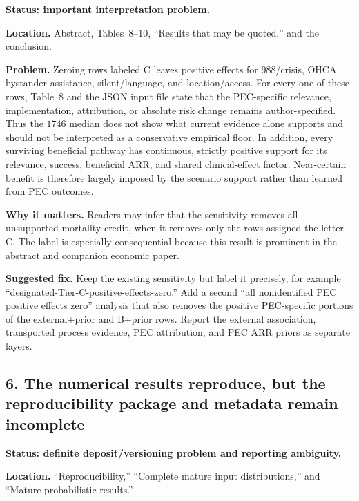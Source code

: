 \documentclass[11pt]{article}
\begin{document}
\textbf{Status: important interpretation problem.}

\textbf{Location.} Abstract, Tables~8--10, ``Results that may be quoted,'' and
the conclusion.

\textbf{Problem.} Zeroing rows labeled C leaves positive effects for
988/crisis, OHCA bystander assistance, silent/language, and location/access.
For every one of these rows, Table~8 and the JSON input file state that the
PEC-specific relevance, implementation, attribution, or absolute risk change
remains author-specified.  Thus the $1746$ median does not show what current
evidence alone supports and should not be interpreted as a conservative
empirical floor.  In addition, every surviving beneficial pathway has
continuous, strictly positive support for its relevance, success, beneficial
ARR, and shared clinical-effect factor.  Near-certain benefit is therefore
largely imposed by the scenario support rather than learned from PEC outcomes.

\textbf{Why it matters.} Readers may infer that the sensitivity removes all
unsupported mortality credit, when it removes only the rows assigned the
letter C.  The label is especially consequential because this result is
prominent in the abstract and companion economic paper.

\textbf{Suggested fix.} Keep the existing sensitivity but label it precisely,
for example ``designated-Tier-C-positive-effects-zero.''  Add a second
``all nonidentified PEC positive effects zero'' analysis that also removes the
positive PEC-specific portions of the external+prior and B+prior rows.  Report
the external association, transported process evidence, PEC attribution, and
PEC ARR priors as separate layers.

\subsection*{6. The numerical results reproduce, but the reproducibility package
and metadata remain incomplete}

\textbf{Status: definite deposit/versioning problem and reporting ambiguity.}

\textbf{Location.} ``Reproducibility,'' ``Complete mature input
distributions,'' and ``Mature probabilistic results.''
\end{document}
